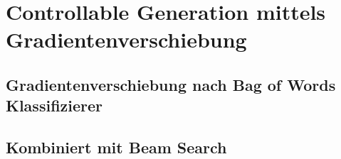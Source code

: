 \section{Controllable Generation mittels Gradientenverschiebung}\raggedbottom

\subsection{Gradientenverschiebung nach Bag of Words Klassifizierer}

\subsection{Kombiniert mit Beam Search}


\pagebreak
